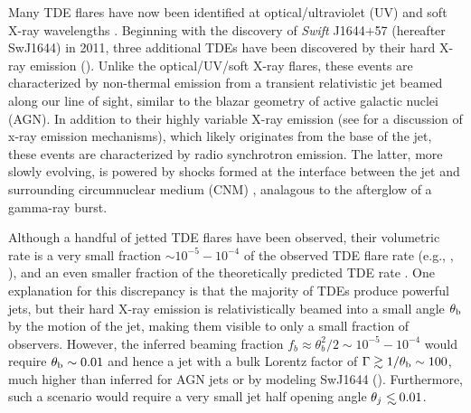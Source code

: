 \documentclass[usenatbib,fleqn]{mnras}
\newcommand\lsim{\mathrel{\rlap{\lower4pt\hbox{\hskip1pt$\sim$}}
    \raise1pt\hbox{$<$}}}
\begin{document}
Many TDE flares have now been identified at optical/ultraviolet (UV)
\citep{Gezari+2008, Gezari+2009, van-Velzen+2011, Gezari+2012,
  Arcavi+2014, Chornock+2014, Holoien+2014, Vinko+2015, Holoien+2016}
and soft X-ray wavelengths \citep{Bade+1996, Grupe+1999,
  Komossa&Greiner1999, Greiner+2000, Esquej+2007, Maksym+2010,
  Saxton+2012}. Beginning with the discovery of {\it Swift} J1644+57
(hereafter SwJ1644) in 2011, three additional TDEs have been
discovered by their hard X-ray emission (\citealt{Bloom+2011,
  Levan+2011, Burrows+2011, Zauderer+2011, Cenko+2012, Pasham+2015,
  Brown+2015}).  Unlike the optical/UV/soft X-ray flares, these events
are characterized by non-thermal emission from a transient
relativistic jet beamed along our line of sight, similar to the blazar
geometry of active galactic nuclei (AGN).  In addition to their highly
variable X-ray emission (see \citealt{Crumley+2016} for a discussion
of x-ray emission mechanisms), which likely originates from the base
of the jet, these events are characterized by radio synchrotron
emission.  The latter, more slowly evolving, is powered by shocks
formed at the interface between the jet and surrounding circumnuclear
medium (CNM)
\citep{Bloom+2011,Giannios&Metzger2011,Metzger+2012,De-Colle+2012,Kumar+13,Mimica+2015},
analagous to the afterglow of a gamma-ray burst.

Although a handful of jetted TDE flares have been observed, their
volumetric rate is a very small fraction $\sim 10^{-5}-10^{-4}$ of the
observed TDE flare rate (e.g., \citealt{Burrows+2011},
\citealt{Brown+2015}), and an even smaller fraction of the
theoretically predicted TDE rate
\citep{Wang&Merritt2004,Stone&Metzger2016}.  One explanation for this
discrepancy is that the majority of TDEs produce powerful jets, but
their hard X-ray emission is relativistically beamed into a small
angle $\theta_{\rm b}$ by the motion of the jet, making them
visible to only a small fraction of observers.  However, the inferred
beaming fraction $f_b \approx \theta_{b}^{2}/2 \sim 10^{-5}-10^{-4}$
would require $\theta_{\rm b} \sim 0.01$ and hence a jet with a bulk
Lorentz factor of $\Gamma \gtrsim 1/\theta_{\rm b} \sim 100$, much
higher than inferred for AGN jets or by modeling SwJ1644
(\citealt{Metzger+2012}). Furthermore, such a scenario would require a
very small jet half opening angle $\theta_j\lsim 0.01$.
\end{document}
